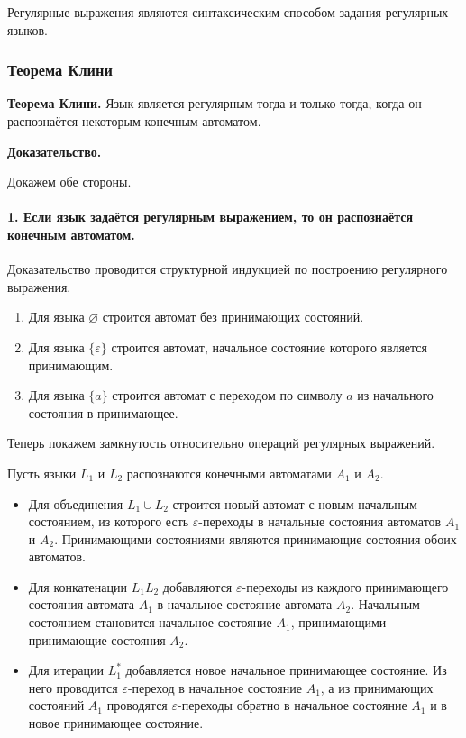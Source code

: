 \documentclass[12pt,a4paper]{article}
\begin{document}
Регулярные выражения являются синтаксическим способом задания регулярных языков.

\subsubsection{Теорема Клини}

\textbf{Теорема Клини.}
Язык является регулярным тогда и только тогда, когда он распознаётся некоторым конечным автоматом.

\textbf{Доказательство.}

Докажем обе стороны.

\paragraph{1. Если язык задаётся регулярным выражением, то он распознаётся конечным автоматом.}

Доказательство проводится структурной индукцией по построению регулярного выражения.

\begin{enumerate}
    \item Для языка $\varnothing$ строится автомат без принимающих состояний.
    \item Для языка $\{\varepsilon\}$ строится автомат, начальное состояние которого является принимающим.
    \item Для языка $\{a\}$ строится автомат с переходом по символу $a$ из начального состояния в принимающее.
\end{enumerate}

Теперь покажем замкнутость относительно операций регулярных выражений.

Пусть языки $L_1$ и $L_2$ распознаются конечными автоматами $A_1$ и $A_2$.

\begin{itemize}
    \item Для объединения $L_1 \cup L_2$ строится новый автомат с новым начальным состоянием, из которого есть $\varepsilon$-переходы в начальные состояния автоматов $A_1$ и $A_2$. Принимающими состояниями являются принимающие состояния обоих автоматов.
    \item Для конкатенации $L_1L_2$ добавляются $\varepsilon$-переходы из каждого принимающего состояния автомата $A_1$ в начальное состояние автомата $A_2$. Начальным состоянием становится начальное состояние $A_1$, принимающими --- принимающие состояния $A_2$.
    \item Для итерации $L_1^*$ добавляется новое начальное принимающее состояние. Из него проводится $\varepsilon$-переход в начальное состояние $A_1$, а из принимающих состояний $A_1$ проводятся $\varepsilon$-переходы обратно в начальное состояние $A_1$ и в новое принимающее состояние.
\end{itemize}
\end{document}

